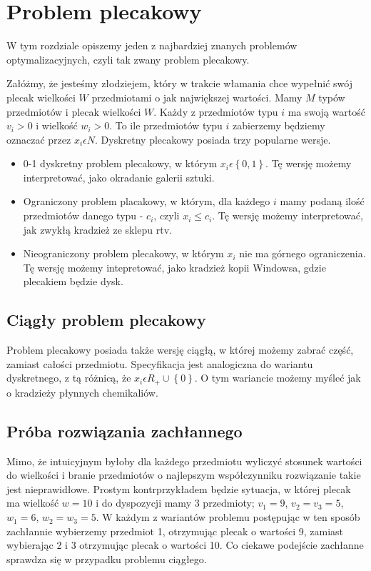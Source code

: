 \section{Problem plecakowy}

\label{sec:plecaki}

W tym rozdziale opiszemy jeden z najbardziej znanych problemów optymalizacyjnych, czyli tak zwany problem plecakowy.

Załóżmy, że jesteśmy złodziejem, który w trakcie włamania chce wypełnić swój plecak wielkości $W$ przedmiotami o jak największej wartości.
Mamy $M$ typów przedmiotów i plecak wielkości $W$.
Każdy z przedmiotów typu $i$ ma swoją wartość $v_i> 0$ i wielkość $w_i> 0$.
To ile przedmiotów typu $i$ zabierzemy będziemy oznaczać przez $x_i\epsilon N$.
Dyskretny plecakowy posiada trzy popularne wersje.


\begin{itemize}
  \item 0-1 dyskretny problem plecakowy, w którym $x_i \epsilon \left \{ 0, 1 \right \}$.
  Tę wersję możemy interpretować, jako okradanie galerii sztuki.
  \item Ograniczony problem placakowy, w którym, dla każdego $i$ mamy podaną ilość przedmiotów danego typu - $c_i$, czyli $x_i \leq c_i$.
  Tę wersję możemy interpretować, jak zwykłą kradzież ze sklepu rtv.
  \item Nieograniczony problem plecakowy, w którym $x_i$ nie ma górnego ograniczenia.
  Tę wersję możemy intepretować, jako kradzież kopii Windowsa, gdzie plecakiem będzie dysk.
\end{itemize}

\subsection{Ciągły problem plecakowy}
Problem plecakowy posiada także wersję ciągłą, w której możemy zabrać część, zamiast całości przedmiotu.
Specyfikacja jest analogiczna do wariantu dyskretnego, z tą różnicą, że $x_i \epsilon R_+ \cup \left \{ 0 \right \}$.
O tym wariancie możemy myśleć jak o kradzieży płynnych chemikaliów.

\subsection{Próba rozwiązania zachłannego}
Mimo, że intuicyjnym byłoby dla każdego przedmiotu wyliczyć stosunek wartości do wielkości i branie przedmiotów
o najlepszym współczynniku rozwiązanie takie jest nieprawidłowe.
Prostym kontrprzykładem będzie sytuacja, w której plecak ma wielkość $w = 10$ i do dyspozycji mamy 3 przedmioty;
$v_1=9$, $v_2=v_3=5$, $w_1=6$, $w_2=w_3=5$. W każdym z wariantów problemu postępując w ten sposób zachłannie wybierzemy przedmiot 1,
otrzymując plecak o wartości 9, zamiast wybierając 2 i 3 otrzymując plecak o wartości 10.
Co ciekawe podejście zachłanne sprawdza się w przypadku problemu ciągłego.

